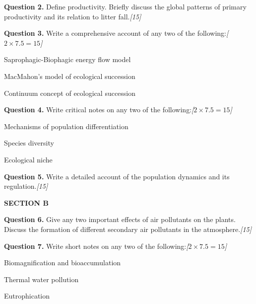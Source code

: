 \documentclass[11pt,a4paper]{article}
\newcommand{\pts}[1]{\hfill   \textit{[#1]}}
\begin{document}
\medskip


\noindent   \textbf{Question 2.} Define productivity. Briefly discuss the global patterns of primary productivity and its relation to litter fall.\pts{15}

\medskip


\noindent   \textbf{Question 3.} Write a comprehensive account of any two of the following:\pts{$2  \times 7.5 = 15$}

\begin{parts}
  \item Saprophagic-Biophagic energy flow model
  \item MacMahon's model of ecological succession
  \item Continuum concept of ecological succession
\end{parts}

\medskip


\noindent   \textbf{Question 4.} Write critical notes on any two of the following:\pts{$2  \times 7.5 = 15$}

\begin{parts}
  \item Mechanisms of population differentiation
  \item Species diversity
  \item Ecological niche
\end{parts}

\medskip


\noindent   \textbf{Question 5.} Write a detailed account of the population dynamics and its regulation.\pts{15}

\bigskip

\begin{center}
   \textbf{SECTION B}
\end{center}
\medskip

\medskip


\noindent   \textbf{Question 6.} Give any two important effects of air pollutants on the plants. Discuss the formation of different secondary air pollutants in the atmosphere.\pts{15}

\medskip


\noindent   \textbf{Question 7.} Write short notes on any two of the following:\pts{$2  \times 7.5 = 15$}

\begin{parts}
  \item Biomagnification and bioaccumulation
  \item Thermal water pollution
  \item Eutrophication
\end{parts}
\end{document}
